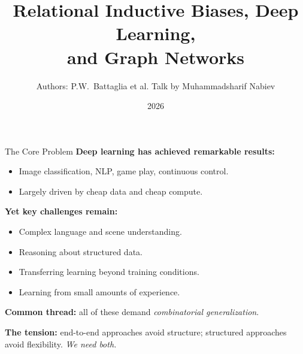 \documentclass[10pt]{beamer}
\title{Relational Inductive Biases, Deep Learning,\\and Graph Networks}
\author{
Authors: P.W.\ Battaglia et al.\newline
\small Talk by Muhammadsharif Nabiev
}
\institute{Moscow Institute of Physics and Technology}
\date{2026}
\begin{document}
\begin{frame}
  \titlepage
\end{frame}

\begin{frame}{The Core Problem}
\textbf{Deep learning has achieved remarkable results:}
\begin{itemize}
    \item Image classification, NLP, game play, continuous control.
    \item Largely driven by cheap data and cheap compute.
\end{itemize}

\vspace{0.4cm}
\textbf{Yet key challenges remain:}
\begin{itemize}
    \item Complex language and scene understanding.
    \item Reasoning about structured data.
    \item Transferring learning beyond training conditions.
    \item Learning from small amounts of experience.
\end{itemize}

\vspace{0.4cm}
\textbf{Common thread:} all of these demand \emph{combinatorial generalization}.

\vspace{0.3cm}
\textbf{The tension:} end-to-end approaches avoid structure; structured approaches
avoid flexibility. \emph{We need both.}
\end{frame}
\end{document}
